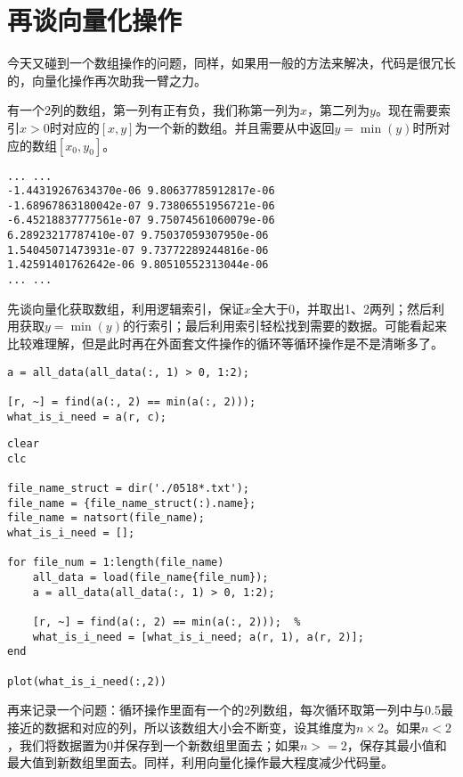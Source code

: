 \section{再谈向量化操作}

今天又碰到一个数组操作的问题，同样，如果用一般的方法来解决，代码是很冗长的，向量化操作再次助我一臂之力。

有一个2列的数组，第一列有正有负，我们称第一列为$ x $，第二列为$ y $。现在需要索引$ x>0 $时对应的$ [x, y] $为一个新的数组。并且需要从中返回$ y=\min(y) $时所对应的数组$ [x_0, y_0] $。

\begin{verbatim}
... ...
-1.44319267634370e-06 9.80637785912817e-06
-1.68967863180042e-07 9.73806551956721e-06
-6.45218837777561e-07 9.75074561060079e-06
6.28923217787410e-07 9.75037059307950e-06
1.54045071473931e-07 9.73772289244816e-06
1.42591401762642e-06 9.80510552313044e-06
... ...
\end{verbatim}

先谈向量化获取数组，利用逻辑索引，保证$ x $全大于0，并取出1、2两列；然后利用获取$ y=\min(y) $的行索引；最后利用索引轻松找到需要的数据。可能看起来比较难理解，但是此时再在外面套文件操作的循环等循环操作是不是清晰多了。

\begin{verbatim}
a = all_data(all_data(:, 1) > 0, 1:2);

[r, ~] = find(a(:, 2) == min(a(:, 2)));
what_is_i_need = a(r, c);
\end{verbatim}

\begin{verbatim}
clear
clc

file_name_struct = dir('./0518*.txt');
file_name = {file_name_struct(:).name};
file_name = natsort(file_name);
what_is_i_need = [];

for file_num = 1:length(file_name)
    all_data = load(file_name{file_num});
    a = all_data(all_data(:, 1) > 0, 1:2);
    
    [r, ~] = find(a(:, 2) == min(a(:, 2)));  % 
    what_is_i_need = [what_is_i_need; a(r, 1), a(r, 2)];
end

plot(what_is_i_need(:,2))
\end{verbatim}

再来记录一个问题：循环操作里面有一个的2列数组，每次循环取第一列中与0.5最接近的数据和对应的列，所以该数组大小会不断变，设其维度为$ n\times 2 $。如果$ n<2 $，我们将数据置为0并保存到一个新数组里面去；如果$ n>=2 $，保存其最小值和最大值到新数组里面去。同样，利用向量化操作最大程度减少代码量。

